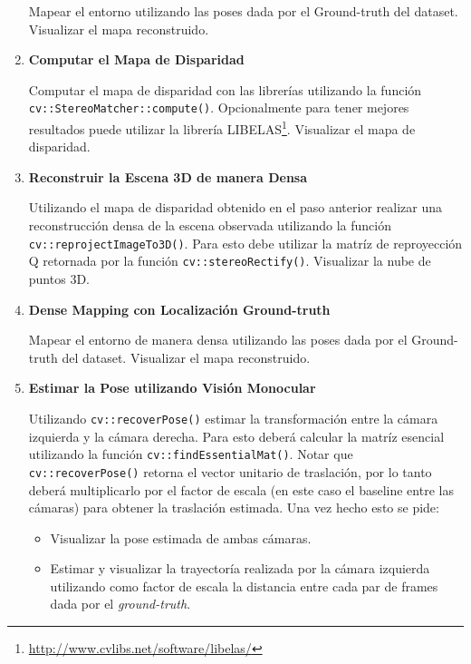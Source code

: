 \documentclass[tp]{lcc}
\begin{document}
\begin{enumerate}
Mapear el entorno utilizando las poses dada por el Ground-truth del dataset. Visualizar el mapa reconstruido.

\item \textbf{Computar el Mapa de Disparidad}

Computar el mapa de disparidad con las librerías utilizando la función \lstinline{cv::StereoMatcher::compute()}. Opcionalmente para tener mejores resultados puede utilizar la librería LIBELAS\footnote{\url{http://www.cvlibs.net/software/libelas/}}. Visualizar el mapa de disparidad.

\item \textbf{Reconstruir la Escena 3D de manera Densa}

Utilizando el mapa de disparidad obtenido en el paso anterior realizar una reconstrucción densa de la escena observada utilizando la función \lstinline{cv::reprojectImageTo3D()}. Para esto debe utilizar la matríz de reproyección Q retornada por la función \lstinline{cv::stereoRectify()}. Visualizar la nube de puntos 3D.

\item \textbf{Dense Mapping con Localización Ground-truth}

Mapear el entorno de manera densa utilizando las poses dada por el Ground-truth del dataset. Visualizar el mapa reconstruido.

\item \textbf{Estimar la Pose utilizando Visión Monocular}

Utilizando \lstinline{cv::recoverPose()} estimar la transformación entre la cámara izquierda y la cámara derecha. Para esto deberá calcular la matríz esencial utilizando la función \lstinline{cv::findEssentialMat()}. Notar que \lstinline{cv::recoverPose()} retorna el vector unitario de traslación, por lo tanto deberá multiplicarlo por el factor de escala (en este caso el baseline entre las cámaras) para obtener la traslación estimada. Una vez hecho esto se pide:

\begin{itemize}
    \item Visualizar la pose estimada de ambas cámaras.
    \item Estimar y visualizar la trayectoría realizada por la cámara izquierda utilizando como factor de escala la distancia entre cada par de frames dada por el \emph{ground-truth}.
\end{itemize}


\end{enumerate}
\end{document}
